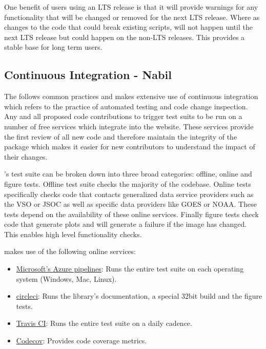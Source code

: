 One benefit of users using an LTS release is that it will provide warnings for any functionality that will be changed or removed for the next LTS release.
Where as changes to the code that could break existing scripts, will not happen until the next LTS release but could happen on the non-LTS releases.
This provides a stable base for long term \sunpy users.

\subsection{Continuous Integration - Nabil}
The \sunpyproj follows common practices and makes extensive use of continuous integration
which refers to the practice of automated testing and code change inspection.  
Any and all proposed code contributions to \sunpypkg trigger test suits to be run on a number of free services which integrate into the \github website. 
These services provide the first review of all new code and therefore maintain the integrity of the package which makes it easier for new contributors to understand the impact of their changes.

\sunpypkg's test suite can be broken down into three broad categories: offline, online and figure tests. 
Offline test suite checks the majority of the codebase. 
Online tests specifically checks code that contacts generalized data service providers such as the VSO  or JSOC as well as specific data providers like GOES or NOAA. 
These tests depend on the availability of these online services. 
Finally figure tests check code that generate plots and will generate a failure if the image has changed. 
This enables high level functionality checks.

\sunpy makes use of the following online services:

\begin{itemize}
\item \href{https://azure.microsoft.com/en-gb/services/devops/pipelines/}{Microsoft's Azure pipelines}: Runs the entire test suite on each operating system (Windows, Mac, Linux).
\item \href{https://circleci.com}{circleci}: Runs the library's documentation, a special 32bit build and the figure tests.
\item \href{https://travis-ci.org}{Travis CI}: Runs the entire test suite on a daily cadence.
\item \href{https://codecov.io/}{Codecov}: Provides code coverage metrics.
\end{itemize}

